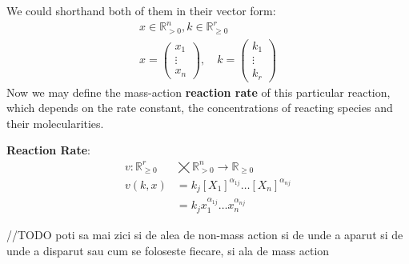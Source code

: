 We could shorthand both of them in their vector form:
\begin{gather*}
	x \in \mathbb{R}^n_{> 0},  k \in \mathbb{R}^r_{\geq 0} \\
	x =
	\begin{pmatrix}
		x_1 \\
		\vdots \\
		x_n 	
	\end{pmatrix}, \quad k =
	\begin{pmatrix*}
		k_1  \\
		\vdots \\
		k_r	
	\end{pmatrix*}
\end{gather*}
Now we may define the mass-action \textbf{reaction rate} of this particular reaction, which depends on the rate constant, the concentrations of reacting species and their molecularities.
\begin{definition}
	\textbf{Reaction Rate}:	
	\begin{align}\label{reaction_rate}
		v : \mathbb{R}^r_{\geq 0}  &\bigtimes \mathbb{R}^n_{> 0} \rightarrow \mathbb{R}_{\geq 0}  \nonumber \\
		v(k,x) &= k_j [X_1]^{\alpha_{1j}} \dots [X_n]^{\alpha_{nj}} \\
		&= k_j x_1^{\alpha_{1j}} \dots x_n^{\alpha_{nj}} \nonumber
	\end{align}
\end{definition}

\hfill\break
//TODO poti sa mai zici si de alea de non-mass action si de unde a aparut si de unde a disparut sau cum se foloseste fiecare, si ala de mass action
\hfill\break

